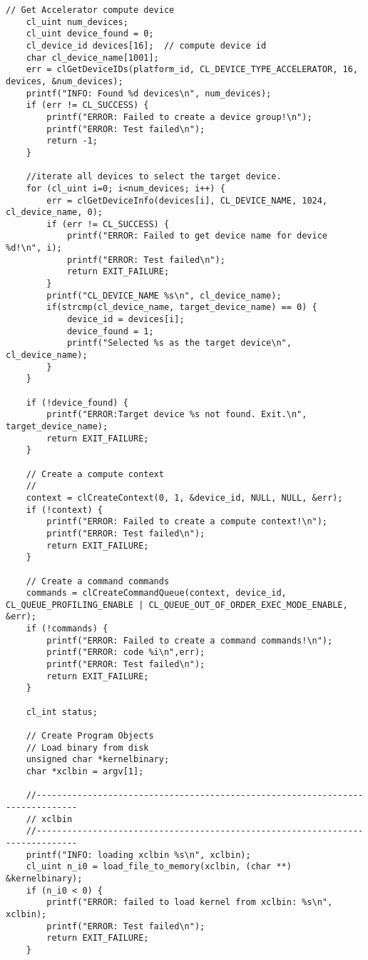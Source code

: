\begin{lstlisting}[label=code:hostexample3, caption=Содержимое файла host\_example.cpp, breakatwhitespace=false]
    // Get Accelerator compute device
    cl_uint num_devices;
    cl_uint device_found = 0;
    cl_device_id devices[16];  // compute device id
    char cl_device_name[1001];
    err = clGetDeviceIDs(platform_id, CL_DEVICE_TYPE_ACCELERATOR, 16, devices, &num_devices);
    printf("INFO: Found %d devices\n", num_devices);
    if (err != CL_SUCCESS) {
        printf("ERROR: Failed to create a device group!\n");
        printf("ERROR: Test failed\n");
        return -1;
    }

    //iterate all devices to select the target device.
    for (cl_uint i=0; i<num_devices; i++) {
        err = clGetDeviceInfo(devices[i], CL_DEVICE_NAME, 1024, cl_device_name, 0);
        if (err != CL_SUCCESS) {
            printf("ERROR: Failed to get device name for device %d!\n", i);
            printf("ERROR: Test failed\n");
            return EXIT_FAILURE;
        }
        printf("CL_DEVICE_NAME %s\n", cl_device_name);
        if(strcmp(cl_device_name, target_device_name) == 0) {
            device_id = devices[i];
            device_found = 1;
            printf("Selected %s as the target device\n", cl_device_name);
        }
    }

    if (!device_found) {
        printf("ERROR:Target device %s not found. Exit.\n", target_device_name);
        return EXIT_FAILURE;
    }

    // Create a compute context
    //
    context = clCreateContext(0, 1, &device_id, NULL, NULL, &err);
    if (!context) {
        printf("ERROR: Failed to create a compute context!\n");
        printf("ERROR: Test failed\n");
        return EXIT_FAILURE;
    }

    // Create a command commands
    commands = clCreateCommandQueue(context, device_id, CL_QUEUE_PROFILING_ENABLE | CL_QUEUE_OUT_OF_ORDER_EXEC_MODE_ENABLE, &err);
    if (!commands) {
        printf("ERROR: Failed to create a command commands!\n");
        printf("ERROR: code %i\n",err);
        printf("ERROR: Test failed\n");
        return EXIT_FAILURE;
    }

    cl_int status;

    // Create Program Objects
    // Load binary from disk
    unsigned char *kernelbinary;
    char *xclbin = argv[1];

    //------------------------------------------------------------------------------
    // xclbin
    //------------------------------------------------------------------------------
    printf("INFO: loading xclbin %s\n", xclbin);
    cl_uint n_i0 = load_file_to_memory(xclbin, (char **) &kernelbinary);
    if (n_i0 < 0) {
        printf("ERROR: failed to load kernel from xclbin: %s\n", xclbin);
        printf("ERROR: Test failed\n");
        return EXIT_FAILURE;
    }


\end{lstlisting}
